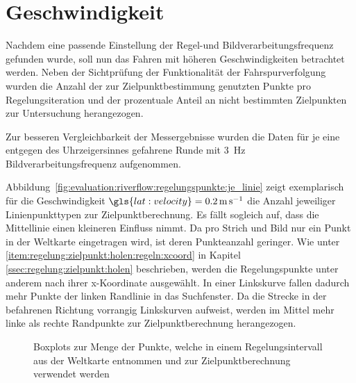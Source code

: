 \section{Geschwindigkeit \dcfirstauthorshort}
\label{ssec:evaluation:messungen:geschwindigkeit}

Nachdem eine passende Einstellung der Regel-und Bildverarbeitungsfrequenz gefunden wurde, soll nun das Fahren mit höheren Geschwindigkeiten betrachtet werden. Neben der Sichtprüfung der Funktionalität der Fahrspurverfolgung wurden die Anzahl der zur Zielpunktbestimmung genutzten Punkte pro Regelungsiteration und der prozentuale Anteil an nicht bestimmten Zielpunkten zur Untersuchung herangezogen. 

Zur besseren Vergleichbarkeit der Messergebnisse wurden die Daten für je eine entgegen des Uhrzeigersinnes gefahrene Runde mit \SI{3}{\hertz} Bildverarbeitungsfrequenz aufgenommen.

Abbildung~\ref{fig:evaluation:riverflow:regelungspunkte:je_linie} zeigt exemplarisch für die Geschwindigkeit \( \gls{lat:velocity} = 
\SI{0,2}{\metre\per\second} \) die  Anzahl jeweiliger Linienpunkttypen zur Zielpunktberechnung. Es fällt sogleich auf, dass die Mittellinie einen kleineren Einfluss nimmt. Da pro Strich und Bild nur ein Punkt in der Weltkarte 
eingetragen wird, ist deren Punkteanzahl geringer. Wie unter 
\ref{item:regelung:zielpunkt:holen:regeln:xcoord} in Kapitel 
\ref{ssec:regelung:zielpunkt:holen} beschrieben, werden die Regelungspunkte unter anderem nach ihrer x-Koordinate ausgewählt. In einer Linkskurve fallen dadurch mehr Punkte der linken Randlinie in das Suchfenster. Da die Strecke in 
der befahrenen Richtung vorrangig Linkskurven aufweist, werden im Mittel mehr linke als rechte Randpunkte zur Zielpunktberechnung herangezogen.

\begin{figure}[htbp] %
	\centering
	\hfill
	\caption{Boxplots zur Menge der Punkte, welche in einem Regelungsintervall 
	aus der Weltkarte entnommen und zur Zielpunktberechnung verwendet werden}
	\label{fig:evaluation:riverflow:regelungspunkte}
\end{figure}

